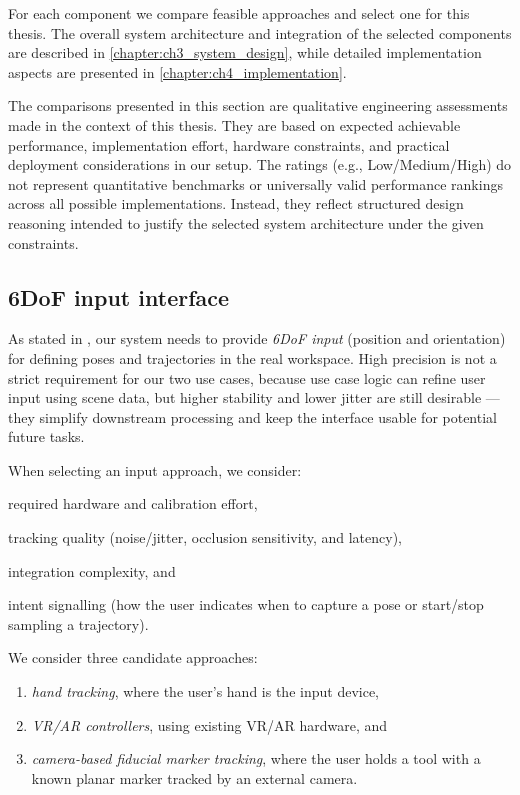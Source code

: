 For each component we compare feasible approaches and select one for this thesis. The overall system architecture and integration of the selected components are described in \autoref{chapter:ch3_system_design}, while detailed implementation aspects are presented in \autoref{chapter:ch4_implementation}.

The comparisons presented in this section are qualitative engineering assessments made in the context of this thesis. They are based on expected achievable performance, implementation effort, hardware constraints, and practical deployment considerations in our setup. The ratings (e.g., Low/Medium/High) do not represent quantitative benchmarks or universally valid performance rankings across all possible implementations. Instead, they reflect structured design reasoning intended to justify the selected system architecture under the given constraints.

\subsection{6DoF input interface} \label{subsec:ch2_analysis_6DoF_input_interface}

As stated in , our system needs to provide \emph{6DoF input} (position and orientation) for defining poses and trajectories in the real workspace. High precision is not a strict requirement for our two use cases, because use case logic can refine user input using scene data, but higher stability and lower jitter are still desirable --- they simplify downstream processing and keep the interface usable for potential future tasks.

When selecting an input approach, we consider:
\begin{enumerate*}[label=(\roman*)]
    \item required hardware and calibration effort,
    \item tracking quality (noise/jitter, occlusion sensitivity, and latency),
    \item integration complexity, and
    \item intent signalling (how the user indicates when to capture a pose or start/stop sampling a trajectory).
\end{enumerate*}

We consider three candidate approaches:
\begin{enumerate}[label=(\roman*), itemsep=0.2em]
    \item \emph{hand tracking}, where the user's hand is the input device,
    \item \emph{VR/AR controllers}, using existing VR/AR hardware, and
    \item \emph{camera-based fiducial marker tracking}, where the user holds a tool with a known planar marker tracked by an external camera.
\end{enumerate}


